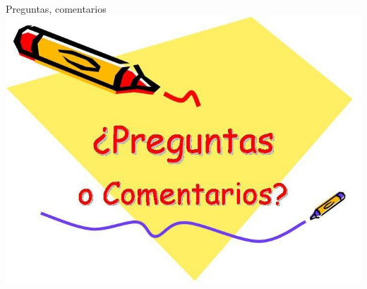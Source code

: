 \documentclass[10pt,xcolor={table,dvipsnames},t]{beamer}
\begin{document}
\begin{frame}{Preguntas, comentarios}
\includegraphics[scale=0.5]{images/any question.jpg}

\end{frame}



\end{document}
